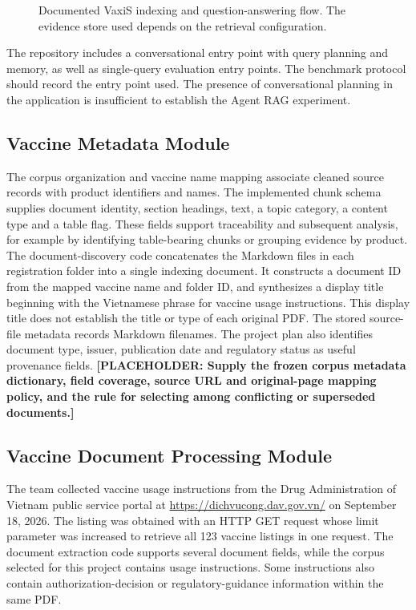 \documentclass[oneside]{sn-jnl}
\newcommand{\pending}[1]{\textbf{\textcolor{red!65!black}{[PLACEHOLDER: #1]}}}
\begin{document}
\begin{figure}[htbp]
\centering
{}
\caption{Documented VaxiS indexing and question-answering flow. The evidence store used depends on the retrieval configuration.}
\label{fig:system}
\end{figure}

The repository includes a conversational entry point with query planning and memory, as well as single-query evaluation entry points. The benchmark protocol should record the entry point used. The presence of conversational planning in the application is insufficient to establish the Agent RAG experiment.

\subsection{Vaccine Metadata Module}
The corpus organization and vaccine name mapping associate cleaned source records with product identifiers and names. The implemented chunk schema supplies document identity, section headings, text, a topic category, a content type and a table flag. These fields support traceability and subsequent analysis, for example by identifying table-bearing chunks or grouping evidence by product. The document-discovery code concatenates the Markdown files in each registration folder into a single indexing document. It constructs a document ID from the mapped vaccine name and folder ID, and synthesizes a display title beginning with the Vietnamese phrase for vaccine usage instructions. This display title does not establish the title or type of each original PDF. The stored source-file metadata records Markdown filenames. The project plan also identifies document type, issuer, publication date and regulatory status as useful provenance fields.
\pending{Supply the frozen corpus metadata dictionary, field coverage, source URL and original-page mapping policy, and the rule for selecting among conflicting or superseded documents.}

\subsection{Vaccine Document Processing Module}
The team collected vaccine usage instructions from the Drug Administration of Vietnam public service portal at \url{https://dichvucong.dav.gov.vn/} on September 18, 2026. The listing was obtained with an HTTP GET request whose limit parameter was increased to retrieve all 123 vaccine listings in one request. The document extraction code supports several document fields, while the corpus selected for this project contains usage instructions. Some instructions also contain authorization-decision or regulatory-guidance information within the same PDF.
\end{document}
